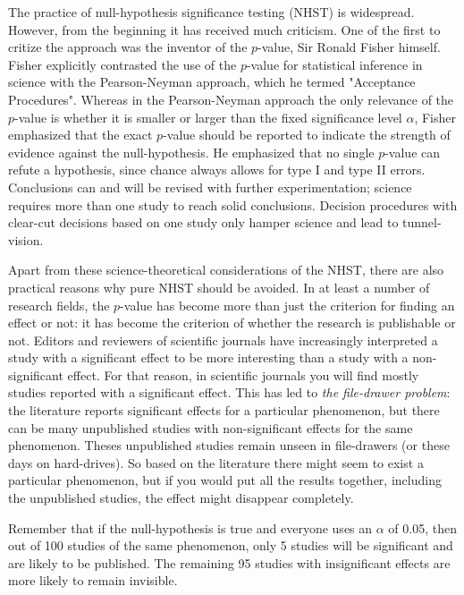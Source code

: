 \documentclass[]{book}\usepackage[]{graphicx}\usepackage[]{color}
\begin{document}
The practice of null-hypothesis significance testing (NHST) is widespread. However, from the beginning it has received much criticism. One of the first to critize the approach was the inventor of the $p$-value, Sir Ronald Fisher himself. Fisher explicitly contrasted the use of the $p$-value for statistical inference in science with the Pearson-Neyman approach, which he termed "Acceptance Procedures". Whereas in the Pearson-Neyman approach the only relevance of the $p$-value is whether it is smaller or larger than the fixed significance level $\alpha$, Fisher emphasized that the exact $p$-value should be reported to indicate the strength of evidence against the null-hypothesis. He emphasized that no single $p$-value can refute a hypothesis, since chance always allows for type I and type II errors. Conclusions can and will be revised with further experimentation; science requires more than one study to reach solid conclusions. Decision procedures with clear-cut decisions based on one study only hamper science and lead to tunnel-vision.

Apart from these science-theoretical considerations of the NHST, there are also practical reasons why pure NHST should be avoided. In at least a number of research fields, the $p$-value has become more than just the criterion for finding an effect or not: it has become the criterion of whether the research is publishable or not. Editors and reviewers of scientific journals have increasingly interpreted a study with a significant effect to be more interesting than a study with a non-significant effect. For that reason, in scientific journals you will find mostly studies reported with a significant effect. This has led to \textit{the file-drawer problem}: the literature reports significant effects for a particular phenomenon, but there can be many unpublished studies with non-significant effects for the same phenomenon. Theses unpublished studies remain unseen in file-drawers (or these days on hard-drives). So based on the literature there might seem to exist a particular phenomenon, but if you would put all the results together, including the unpublished studies, the effect might disappear completely.

Remember that if the null-hypothesis is true and everyone uses an $\alpha$ of 0.05, then out of 100 studies of the same phenomenon, only 5 studies will be significant and are likely to be published. The remaining 95 studies with insignificant effects are more likely to remain invisible. 
\end{document}
